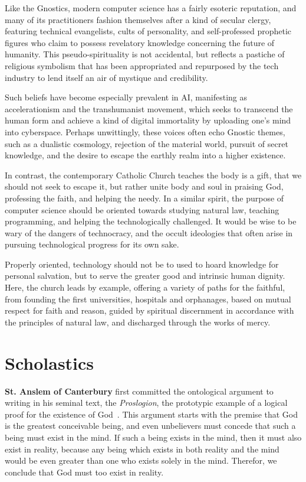 \documentclass[sigplan,nonacm]{acmart}\settopmatter{printfolios=false,printccs=false,printacmref=false}
\begin{document}
Like the Gnostics, modern computer science has a fairly esoteric reputation, and many of its practitioners fashion themselves after a kind of secular clergy, featuring technical evangelists, cults of personality, and self-professed prophetic figures who claim to possess revelatory knowledge concerning the future of humanity. This pseudo-spirituality is not accidental, but reflects a pastiche of religious symbolism that has been appropriated and repurposed by the tech industry to lend itself an air of mystique and credibility.

Such beliefs have become especially prevalent in AI, manifesting as accelerationism and the transhumanist movement, which seeks to transcend the human form and achieve a kind of digital immortality by uploading one's mind into cyberspace. Perhaps unwittingly, these voices often echo Gnostic themes, such as a dualistic cosmology, rejection of the material world, pursuit of secret knowledge, and the desire to escape the earthly realm into a higher existence.

In contrast, the contemporary Catholic Church teaches the body is a gift, that we should not seek to escape it, but rather unite body and soul in praising God, professing the faith, and helping the needy. In a similar spirit, the purpose of computer science should be oriented towards studying natural law, teaching programming, and helping the technologically challenged. It would be wise to be wary of the dangers of technocracy, and the occult ideologies that often arise in pursuing technological progress for its own sake.

Properly oriented, technology should not be to used to hoard knowledge for personal salvation, but to serve the greater good and intrinsic human dignity. Here, the church leads by example, offering a variety of paths for the faithful, from founding the first universities, hospitals and orphanages, based on mutual respect for faith and reason, guided by spiritual discernment in accordance with the principles of natural law, and discharged through the works of mercy.

\section{Scholastics}

\textbf{St. Anslem of Canterbury} first committed the ontological argument to writing in his seminal text, the \textit{Proslogion}, the prototypic example of a logical proof for the existence of God~\cite{anslem1078fides}. This argument starts with the premise that God is the greatest conceivable being, and even unbelievers must concede that such a being must exist in the mind. If such a being exists in the mind, then it must also exist in reality, because any being which exists in both reality and the mind would be even greater than one who exists solely in the mind. Therefor, we conclude that God must too exist in reality.
\end{document}
